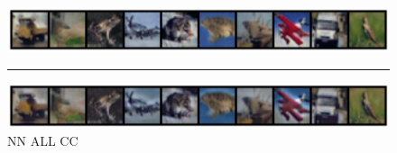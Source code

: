 \begin{figure}
    \centerline{\hspace*{8mm}\includegraphics[width=1.4\textwidth]{figures/reconstruction_CIFAR10_NN_ALL_epoch_100.png}}
    \caption*{\normalsize{NN ALL CC}}
    \rule{0.4\textwidth}{.4pt}
    
    \centerline{\hspace*{8mm}\includegraphics[width=1.4\textwidth]{figures/reconstruction_CIFAR10_NN_ALL_CC_epoch_100.png}}
\end{figure}

